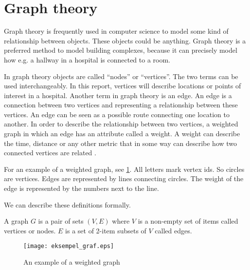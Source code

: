 \section{Graph theory}

Graph theory is frequently used in computer science to model some kind of relationship between objects. These objects could be anything. Graph theory is a preferred method to model building complexes, because it can precisely model how e.g. a hallway in a hospital is connected to a room.

In graph theory objects are called \enquote{nodes} or \enquote{vertices}. The two terms can be used interchangeably. In this report, vertices will describe locations or points of interest in a hospital. Another term in graph theory is an edge. An edge is a connection between two vertices and representing a relationship between these vertices. An edge can be seen as a possible route connecting one location to another. In order to describe the relationship between two vertices, a weighted graph in which an edge has an attribute called a weight. A weight can describe the time, distance or any other metric that in some way can describe how two connected vertices are related \cite{wiki_graph_glos,MIT2012}.

For an example of a weighted graph, see \cref{fig:graph}. All letters mark vertex ids. So circles are vertices. Edges are represented by lines connecting circles. The weight of the edge is represented by the numbers next to the line.

We can describe these definitions formally.\cite{MIT2012}
\begin{mydef}
	A graph $G$ is a pair of sets $(V,E)$ where $V$ is a non-empty set of items called vertices or nodes. $E$ is a set of 2-item subsets of $V$ called edges.
\end{mydef}

  \begin{figure}[ht!]
    \centering
    \texttt{[image: eksempel\_graf.eps]}
    \caption{An example of a weighted graph}
    \label{fig:graph}
  \end{figure}


